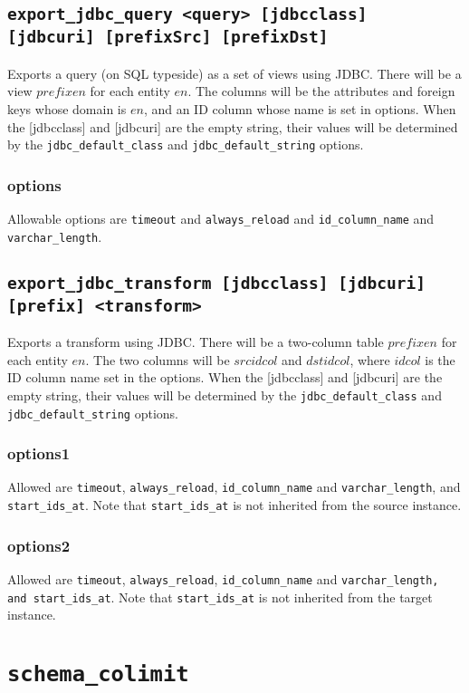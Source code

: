 \documentclass[10pt]{book}
\begin{document}
\section{{\tt export\_jdbc\_query <query> [jdbcclass] [jdbcuri] [prefixSrc] [prefixDst] }}

Exports a query (on SQL typeside) as a set of views using JDBC.  There will be a view $prefixen$ for each entity $en$.  The columns will be the attributes and foreign keys whose domain is $en$, and an ID column whose name is set in options.  When the [jdbcclass] and [jdbcuri] are the empty string, their values will be determined by the {\tt jdbc\_default\_class} and {\tt jdbc\_default\_string} options.

\subsection{options}
Allowable options are {\tt timeout}  and {\tt always\_reload} and  {\tt id\_column\_name} and {\tt varchar\_length}.



\section{{\tt export\_jdbc\_transform [jdbcclass] [jdbcuri] [prefix] <transform>}}
Exports a transform using JDBC.  There will be a two-column table $prefixen$ for each entity $en$.  The two columns will be $srcidcol$ and $dstidcol$, where $idcol$ is the ID column name set in the options.   When the [jdbcclass] and [jdbcuri] are the empty string, their values will be determined by the {\tt jdbc\_default\_class} and {\tt jdbc\_default\_string} options.

\subsection{options1}
Allowed are {\tt timeout}, {\tt always\_reload},  {\tt id\_column\_name} and {\tt varchar\_length}, and {\tt start\_ids\_at}.  Note that {\tt start\_ids\_at} is not inherited from the source instance.
\subsection{options2}
Allowed are {\tt timeout}, {\tt always\_reload},  {\tt id\_column\_name} and {\tt varchar\_length, and {\tt start\_ids\_at}}.  Note that {\tt start\_ids\_at} is not inherited from the target instance.

\chapter{{\tt schema\_colimit}}
\end{document}
